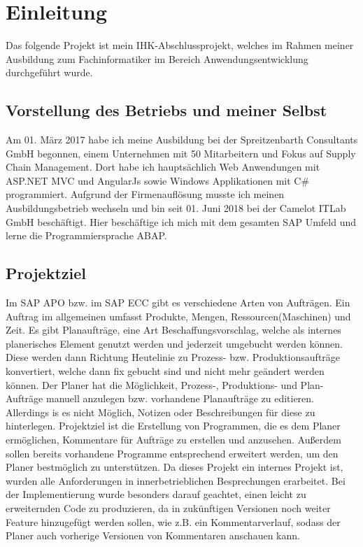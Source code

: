 \section{Einleitung}
\label{sec:Einleitung}
Das folgende Projekt ist mein IHK-Abschlussprojekt, welches im Rahmen meiner Ausbildung zum Fachinformatiker im Bereich Anwendungsentwicklung durchgeführt wurde.

\subsection{Vorstellung des Betriebs und meiner Selbst} 
\label{sec:Vorstellung des Betriebs und meiner Selbst}
Am 01. März 2017 habe ich meine Ausbildung bei der Spreitzenbarth Consultants GmbH begonnen, einem Unternehmen mit 50 Mitarbeitern und Fokus auf Supply Chain Management. Dort habe ich hauptsächlich Web Anwendungen mit ASP.NET MVC und AngularJs sowie Windows Applikationen mit C\# programmiert. Aufgrund der Firmenauflösung musste ich meinen Ausbildungsbetrieb wechseln und bin seit 01. Juni 2018 bei der Camelot ITLab GmbH beschäftigt. Hier beschäftige ich mich mit dem gesamten SAP Umfeld und lerne die Programmiersprache \ac{ABAP}.

\subsection{Projektziel} 
\label{sec:Projektziel}
Im SAP \ac{APO} bzw. im SAP \ac{ECC} gibt es verschiedene Arten von Aufträgen. Ein Auftrag im allgemeinen umfasst Produkte, Mengen, Ressourcen(Maschinen) und Zeit. Es gibt Planaufträge, eine Art Beschaffungsvorschlag, welche als internes planerisches Element genutzt werden und jederzeit umgebucht werden können. Diese werden dann Richtung Heutelinie zu  Prozess- bzw. Produktionsaufträge konvertiert, welche dann fix gebucht sind und nicht mehr geändert werden können. Der Planer hat die Möglichkeit, Prozess-, Produktions- und Plan-Aufträge manuell anzulegen bzw. vorhandene Planaufträge zu editieren. Allerdings is es nicht Möglich, Notizen oder Beschreibungen für diese zu hinterlegen. Projektziel ist die Erstellung von Programmen, die es dem Planer ermöglichen, Kommentare	für Aufträge zu erstellen und anzusehen. Außerdem sollen bereits vorhandene Programme entsprechend erweitert werden, um den Planer bestmöglich zu unterstützen. Da dieses Projekt ein internes Projekt ist, wurden alle Anforderungen in innerbetrieblichen Besprechungen erarbeitet. Bei der Implementierung wurde besonders darauf geachtet, einen leicht zu erweiternden Code zu produzieren, da in zukünftigen Versionen noch weiter Feature hinzugefügt werden sollen, wie z.B. ein Kommentarverlauf, sodass der Planer auch vorherige Versionen von Kommentaren anschauen kann. 

